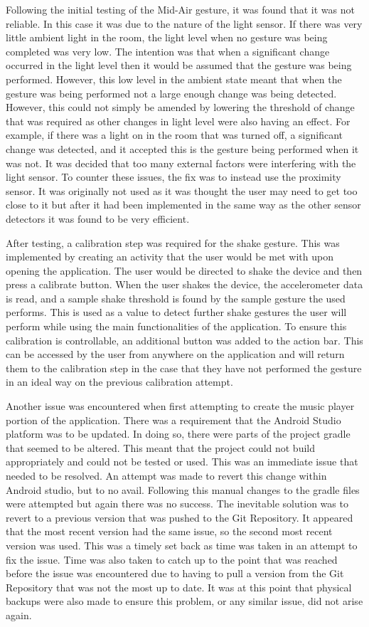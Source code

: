 \documentclass{l4proj}
\begin{document}
Following the initial testing of the Mid-Air gesture, it was found that it was not reliable. In this case it was due to the nature of the light sensor. If there was very little ambient light in the room, the light level when no gesture was being completed was very low. The intention was that when a significant change occurred in the light level then it would be assumed that the gesture was being performed. However, this low level in the ambient state meant that when the gesture was being performed not a large enough change was being detected. However, this could not simply be amended by lowering the threshold of change that was required as other changes in light level were also having an effect. For example, if there was a light on in the room that was turned off, a significant change was detected, and it accepted this is the gesture being performed when it was not. It was decided that too many external factors were interfering with the light sensor. To counter these issues, the fix was to instead use the proximity sensor. It was originally not used as it was thought the user may need to get too close to it but after it had been implemented in the same way as the other sensor detectors it was found to be very efficient.

After testing, a calibration step was required for the shake gesture. This was implemented by creating an activity that the user would be met with upon opening the application. The user would be directed to shake the device and then press a calibrate button. When the user shakes the device, the accelerometer data is read, and a sample shake threshold is found by the sample gesture the used performs. This is used as a value to detect further shake gestures the user will perform while using the main functionalities of the application. To ensure this calibration is controllable, an additional button was added to the action bar. This can be accessed by the user from anywhere on the application and will return them to the calibration step in the case that they have not performed the gesture in an ideal way on the previous calibration attempt.

Another issue was encountered when first attempting to create the music player portion of the application. There was a requirement that the Android Studio platform was to be updated. In doing so, there were parts of the project gradle that seemed to be altered. This meant that the project could not build appropriately and could not be tested or used. This was an immediate issue that needed to be resolved. An attempt was made to revert this change within Android studio, but to no avail. Following this manual changes to the gradle files were attempted but again there was no success. The inevitable solution was to revert to a previous version that was pushed to the Git Repository. It appeared that the most recent version had the same issue, so the second most recent version was used. This was a timely set back as time was taken in an attempt to fix the issue. Time was also taken to catch up to the point that was reached before the issue was encountered due to having to pull a version from the Git Repository that was not the most up to date. It was at this point that physical backups were also made to ensure this problem, or any similar issue, did not arise again.
\end{document}
